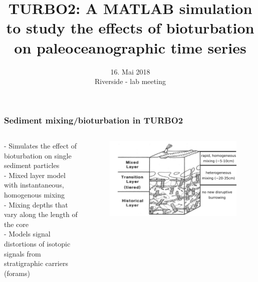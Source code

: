 \documentclass{beamer}
\begin{document}
\title[TURBO2]{TURBO2: A MATLAB simulation to study the effects of bioturbation on paleoceanographic time series
} %


\date{16. Mai 2018\\
Riverside - lab meeting
}


\begin{frame}
 \titlepage
\end{frame}



\begin{frame}
\frametitle{Sediment mixing/bioturbation in TURBO2}
\begin{columns}
\begin{column}{0.4\textwidth}
{\scriptsize
- Simulates the effect of bioturbation on single sediment particles\\[1.5ex]
- Mixed layer model with instantaneous, homogenous mixing \\[1.5ex]
- Mixing depths that vary along the length of the core\\[1.5ex]
- Models signal distortions of isotopic signals from stratigraphic carriers (forams)\\[2.5ex]
}
\end{column}
\begin{column}{0.6\textwidth}
\vspace{-0.8cm}
\begin{figure}[hbtp]
\hspace*{-0.8cm}\includegraphics[width=1.1\textwidth]{figures/Sediment_column.pdf}%
\end{figure}
\end{column}
\end{columns}
\end{frame}
\end{document}
